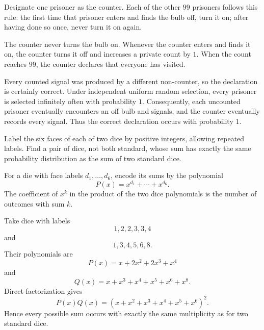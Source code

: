     \begin{solution}
        Designate one prisoner as the counter. Each of the other $99$ prisoners
        follows this rule: the first time that prisoner enters and finds the
        bulb off, turn it on; after having done so once, never turn it on again.

        The counter never turns the bulb on. Whenever the counter enters and
        finds it on, the counter turns it off and increases a private count by
        $1$. When the count reaches $99$, the counter declares that everyone
        has visited.

        Every counted signal was produced by a different non-counter, so the
        declaration is certainly correct. Under independent uniform random
        selection, every prisoner is selected infinitely often with probability
        $1$. Consequently, each uncounted prisoner eventually encounters an off
        bulb and signals, and the counter eventually records every signal.
        Thus the correct declaration occurs with probability $1$.
    \end{solution}

    \begin{expectedproblem}
        Label the six faces of each of two dice by positive integers, allowing
        repeated labels. Find a pair of dice, not both standard, whose sum has
        exactly the same probability distribution as the sum of two standard
        dice.
    \end{expectedproblem}

    \begin{solution}
        For a die with face labels $d_1,\ldots,d_6$, encode its sums by the
        polynomial
        \[
            P(x)=x^{d_1}+\cdots+x^{d_6}.
        \]
        The coefficient of $x^k$ in the product of the two dice polynomials is
        the number of outcomes with sum $k$.

        Take dice with labels
        \[
            \boxed{1,2,2,3,3,4}
        \]
        and
        \[
            \boxed{1,3,4,5,6,8}.
        \]
        Their polynomials are
        \[
            P(x)=x+2x^2+2x^3+x^4
        \]
        and
        \[
            Q(x)=x+x^3+x^4+x^5+x^6+x^8.
        \]
        Direct factorization gives
        \[
            P(x)Q(x)
            =
            (x+x^2+x^3+x^4+x^5+x^6)^2.
        \]
        Hence every possible sum occurs with exactly the same multiplicity as
        for two standard dice.
    \end{solution}


